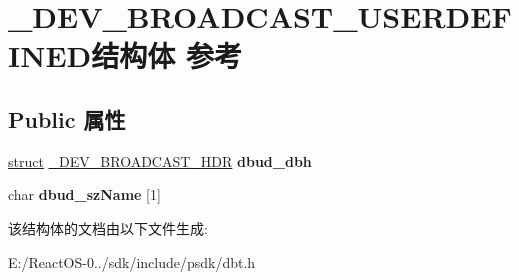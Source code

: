 \hypertarget{struct___d_e_v___b_r_o_a_d_c_a_s_t___u_s_e_r_d_e_f_i_n_e_d}{}\section{\+\_\+\+D\+E\+V\+\_\+\+B\+R\+O\+A\+D\+C\+A\+S\+T\+\_\+\+U\+S\+E\+R\+D\+E\+F\+I\+N\+E\+D结构体 参考}
\label{struct___d_e_v___b_r_o_a_d_c_a_s_t___u_s_e_r_d_e_f_i_n_e_d}
\subsection*{Public 属性}
\begin{DoxyCompactItemize}
\item 
\mbox{\label{struct___d_e_v___b_r_o_a_d_c_a_s_t___u_s_e_r_d_e_f_i_n_e_d_a56a8b747de2e9156b90a42803f90d0a8}} 
\hyperlink{interfacestruct}{struct} \hyperlink{struct___d_e_v___b_r_o_a_d_c_a_s_t___h_d_r}{\+\_\+\+D\+E\+V\+\_\+\+B\+R\+O\+A\+D\+C\+A\+S\+T\+\_\+\+H\+DR} {\bfseries dbud\+\_\+dbh}
\item 
\mbox{\label{struct___d_e_v___b_r_o_a_d_c_a_s_t___u_s_e_r_d_e_f_i_n_e_d_afb1072fa5f6c5249c5a4fb70ac23eba8}} 
char {\bfseries dbud\+\_\+sz\+Name} \mbox{[}1\mbox{]}
\end{DoxyCompactItemize}


该结构体的文档由以下文件生成\+:\begin{DoxyCompactItemize}
\item 
E\+:/\+React\+O\+S-\/0../sdk/include/psdk/dbt.\+h\end{DoxyCompactItemize}
